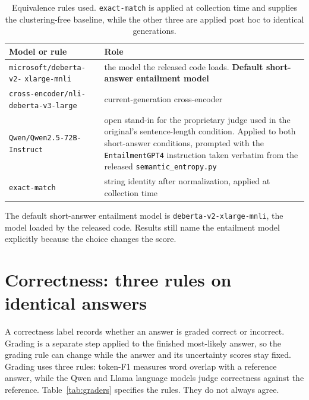 \begin{table}[htb]
\centering
\small
\caption{Equivalence rules used. \texttt{exact-match} is applied at collection
  time and supplies the clustering-free baseline, while the other three are applied
  post hoc to identical generations.}
\label{tab:backends}
\begingroup
\setlength{\tabcolsep}{4pt}
\begin{tabular}{@{}>{\raggedright\arraybackslash}p{4.1cm}>{\raggedright\arraybackslash}p{6.1cm}@{}}
\toprule
Model or rule & Role \\
\midrule
\texttt{microsoft/deberta-v2-} \texttt{xlarge-mnli} & the model the released
  code loads. \textbf{Default short-answer entailment model} \\
\addlinespace[2pt]
\texttt{cross-encoder/nli-} \texttt{deberta-v3-large} & current-generation
  cross-encoder \\
\addlinespace[2pt]
\texttt{Qwen/Qwen2.5-72B-} \texttt{Instruct} & open stand-in for the
  proprietary judge used in the original's sentence-length condition. Applied
  to both short-answer conditions, prompted with the
  \texttt{EntailmentGPT4} instruction taken verbatim from the released
  \texttt{semantic\_entropy.py} \\
\addlinespace[2pt]
\texttt{exact-match} & string identity after normalization, applied at
  collection time \\
\bottomrule
\end{tabular}
\endgroup
\end{table}

The default short-answer entailment model is
\texttt{deberta-v2-xlarge-mnli}, the model loaded by the released code. Results
still name the entailment model explicitly because the choice changes the score.

\section{Correctness: three rules on identical answers}
\label{sec:correctness}

A correctness label records whether an answer is graded correct or incorrect.
Grading is a separate step applied to the finished most-likely answer, so the
grading rule can change while the answer and its uncertainty scores stay fixed.
Grading uses three rules: token-F1 measures word overlap with a reference
answer, while the Qwen and Llama language models judge correctness against the
reference. Table~\ref{tab:graders} specifies the rules. They do not always agree.


